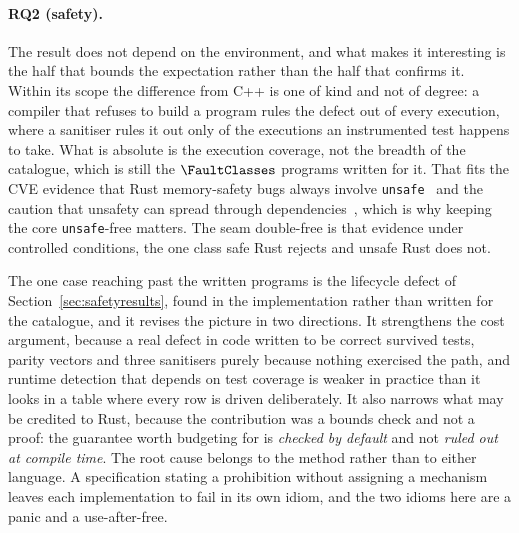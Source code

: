 \paragraph{RQ2 (safety).} The result does not depend on the environment, and what makes it
interesting is the half that bounds the expectation rather than the half that confirms it. Within
its scope the difference from C++ is one of kind and not of degree: a compiler that refuses to
build a program rules the defect out of every execution, where a sanitiser rules it out only of
the executions an instrumented test happens to take. What is absolute is the execution coverage,
not the breadth of the catalogue, which is still the $\FaultClasses$ programs written for it. That
fits the CVE evidence that Rust memory-safety bugs always involve
\texttt{unsafe}~\cite{xu2021rustcve} and the caution that unsafety can spread through
dependencies~\cite{evans2020rust}, which is why keeping the core \texttt{unsafe}-free matters. The
seam double-free is that evidence under controlled conditions, the one class safe Rust rejects and
unsafe Rust does not.

The one case reaching past the written programs is the lifecycle defect of
Section~\ref{sec:safetyresults}, found in the implementation rather than written for the
catalogue, and it revises the picture in two directions. It strengthens the cost argument, because
a real defect in code written to be correct survived tests, parity vectors and three sanitisers
purely because nothing exercised the path, and runtime detection that depends on test coverage is
weaker in practice than it looks in a table where every row is driven deliberately. It also
narrows what may be credited to Rust, because the contribution was a bounds check and not a
proof: the guarantee worth budgeting for is \emph{checked by default} and not \emph{ruled out at
compile time}. The root cause belongs to the method rather than to either language. A
specification stating a prohibition without assigning a mechanism leaves each implementation to
fail in its own idiom, and the two idioms here are a panic and a use-after-free.

